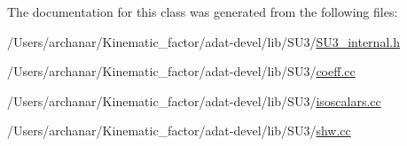 The documentation for this class was generated from the following files\+:\begin{DoxyCompactItemize}
\item 
/\+Users/archanar/\+Kinematic\+\_\+factor/adat-\/devel/lib/\+S\+U3/\mbox{\hyperlink{adat-devel_2lib_2SU3_2SU3__internal_8h}{S\+U3\+\_\+internal.\+h}}\item 
/\+Users/archanar/\+Kinematic\+\_\+factor/adat-\/devel/lib/\+S\+U3/\mbox{\hyperlink{adat-devel_2lib_2SU3_2coeff_8cc}{coeff.\+cc}}\item 
/\+Users/archanar/\+Kinematic\+\_\+factor/adat-\/devel/lib/\+S\+U3/\mbox{\hyperlink{adat-devel_2lib_2SU3_2isoscalars_8cc}{isoscalars.\+cc}}\item 
/\+Users/archanar/\+Kinematic\+\_\+factor/adat-\/devel/lib/\+S\+U3/\mbox{\hyperlink{adat-devel_2lib_2SU3_2shw_8cc}{shw.\+cc}}\end{DoxyCompactItemize}
